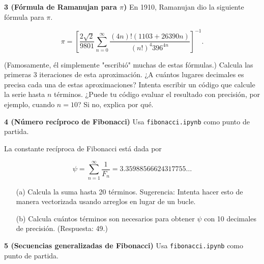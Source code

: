 \documentclass{article}
\begin{document}
\textbf{3 (Fórmula de Ramanujan para \(\pi\))} En 1910, Ramanujan dio la siguiente fórmula para \(\pi\).

\[
\pi = \left[ \frac{2\sqrt{2}}{9801} \sum_{n=0}^{\infty} \frac{(4n)!(1103 + 26390n)}{(n!)^4 396^{4n}} \right]^{-1}.
\]

(Famosamente, él simplemente "escribió" muchas de estas fórmulas.) Calcula las primeras 3 iteraciones de esta aproximación. ¿A cuántos lugares decimales es precisa cada una de estas aproximaciones? Intenta escribir un código que calcule la serie hasta \(n\) términos. ¿Puede tu código evaluar el resultado con precisión, por ejemplo, cuando \(n = 10\)? Si no, explica por qué.


\textbf{4 (Número recíproco de Fibonacci)} Usa \texttt{fibonacci.ipynb} como punto de partida.

La constante recíproca de Fibonacci está dada por

\[
\psi = \sum_{n=1}^{\infty} \frac{1}{F_n} = 3.35988566624317755\ldots
\]

\begin{itemize}
    \item[(a)] Calcula la suma hasta 20 términos.  
    Sugerencia: Intenta hacer esto de manera vectorizada usando arreglos en lugar de un bucle.
    
    \item[(b)] Calcula cuántos términos son necesarios para obtener \(\psi\) con 10 decimales de precisión. (Respuesta: 49.)
\end{itemize}


\textbf{5 (Secuencias generalizadas de Fibonacci)} Usa \texttt{fibonacci.ipynb} como punto de partida.
\end{document}
